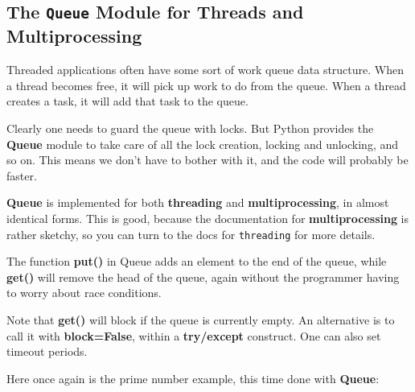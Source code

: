 \subsection{The {\tt Queue} Module for Threads and Multiprocessing}
\label{queue}

Threaded applications often have some sort of work queue data structure.
When a thread becomes free, it will pick up work to do from the queue.
When a thread creates a task, it will add that task to the queue.

Clearly one needs to guard the queue with locks.  But Python provides
the {\bf Queue} module to take care of all the lock creation,
locking and unlocking, and so on.  This means we don't have to bother with
it, and the code will probably be faster.

{\bf Queue} is implemented for both {\bf threading} and {\bf
multiprocessing}, in almost identical forms.  This is good, because the
documentation for {\bf multiprocessing} is rather sketchy, so you can
turn to the docs for {\tt threading} for more details.

The function {\bf put()} in Queue adds an element to the end of the
queue, while {\bf get()} will remove the head of the queue, again
without the programmer having to worry about race conditions.  

Note that {\bf get()} will block if the queue is currently empty.
An alternative is to call it with {\bf block=False}, within a {\bf
try/except} construct.  One can also set timeout periods.

Here once again is the prime number example, this time done with {\bf
Queue}:


